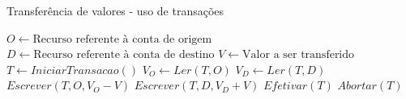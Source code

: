\documentclass[11pt,twoside,a4paper]{book}
\begin{document}
\begin{algorithm}
\caption{Transferência de valores - uso de transações}
\label{alg:transferencia_valores_transacao}
\begin{algorithmic}[1]
\State $O \gets \text{Recurso referente à conta de origem}$
\State $D \gets \text{Recurso referente à conta de destino}$
\State $V \gets \text{Valor a ser transferido}$
\State $T \gets IniciarTransacao()$
\State $V_O \gets Ler(T, O)$
    \State $V_D \gets Ler(T, D)$
    \State $Escrever(T, O, V_O - V)$
    \State $Escrever(T, D, V_D + V)$
    \State $Efetivar(T)$
\Else
    \State $Abortar(T)$
\EndIf
\end{algorithmic}
\end{algorithm}



\end{document}

